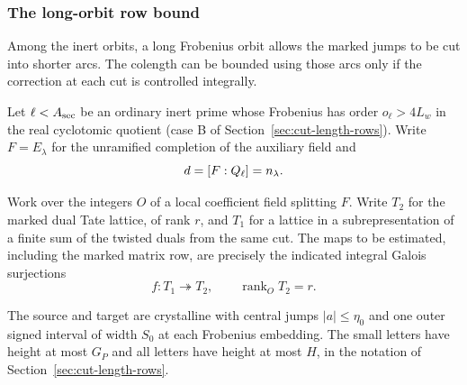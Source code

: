 \subsubsection{The long-orbit row bound}\label{sec:inert-long-orbit}
\hypertarget{source-inert-long-orbit}{}

Among the inert orbits, a long Frobenius orbit allows the marked jumps to be cut into shorter arcs. The colength can be bounded using those arcs only if the correction at each cut is controlled integrally.

\begin{established}\label{hyp:long-orbit-data}
Let \(\ell<A_{\rm sec}\) be an ordinary inert prime whose Frobenius
has order \(o_\ell>4L_w\) in the real cyclotomic quotient
(case B of Section~\ref{sec:cut-length-rows}). Write \(F=E_\lambda\) for the
unramified completion of the auxiliary field and
\[
 d=[F:Q_\ell]=n_\lambda.
\]

Work over the integers \(O\) of a local coefficient field splitting \(F\).
Write \(T_2\) for the marked dual Tate lattice, of rank \(r\), and
\(T_1\) for a lattice in a subrepresentation of a finite sum of the
twisted duals from the same cut. The maps to be estimated, including the marked matrix row, are precisely the indicated integral Galois surjections
\[
 f:T_1\twoheadrightarrow T_2,\qquad \operatorname{rank}_O T_2=r .
\]

The source and target are crystalline with central jumps \(|a|\le\eta_0\) and one outer signed interval of width \(S_0\) at each Frobenius embedding. The small letters have height at most \(G_P\) and all letters have height at most \(H\), in the notation of Section~\ref{sec:cut-length-rows}.
\end{established}

